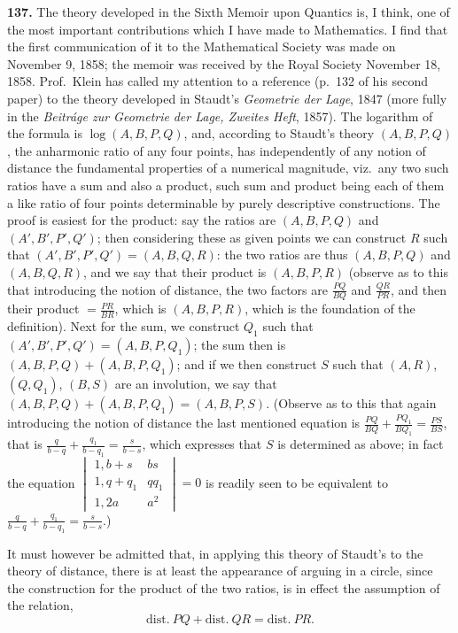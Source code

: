 \documentclass[11pt,a4paper]{book}
\begin{document}
\begin{center}
\textbf{137.} The theory developed in the Sixth Memoir upon Quantics is, I think,
one of the most important contributions which I have made to Mathematics. I find
that the first communication of it to the Mathematical Society was made on November
9, 1858; the memoir was received by the Royal Society November 18, 1858. Prof.\ Klein
has called my attention to a reference (p.~132 of his second paper) to the theory
developed in Staudt's \textit{Geometrie der Lage}, 1847 (more fully in the \textit{Beitr\'{a}ge zur Geometrie}
\textit{der Lage, Zweites Heft}, 1857). The logarithm of the formula is $\log(A,B,P,Q)$, and,
according to Staudt's theory $(A,B,P,Q)$, the anharmonic ratio of any four points, has
independently of any notion of distance the fundamental properties of a numerical
magnitude, viz.\ any two such ratios have a sum and also a product, such sum and
product being each of them a like ratio of four points determinable by purely descriptive
constructions. The proof is easiest for the product: say the ratios are $(A,B,P,Q)$ and
$(A',B',P',Q')$; then considering these as given points we can construct $R$ such that
$(A',B',P',Q') = (A,B,Q,R)$: the two ratios are thus $(A,B,P,Q)$ and $(A,B,Q,R)$, and we
say that their product is $(A,B,P,R)$ (observe as to this that introducing the notion of
distance, the two factors are $\frac{PQ}{BQ}$ and $\frac{QR}{PR}$, and then their product $=\frac{PR}{BR}$, which is $(A,B,P,R)$,
which is the foundation of the definition). Next for the sum, we construct $Q_1$ such that
$(A',B',P',Q') = (A,B,P,Q_1)$; the sum then is $(A,B,P,Q)+(A,B,P,Q_1)$; and if we then
construct $S$ such that $(A,R)$, $(Q,Q_1)$, $(B,S)$ are an involution, we say that
$(A,B,P,Q)+(A,B,P,Q_1) = (A,B,P,S)$. (Observe as to this that again introducing the
notion of distance the last mentioned equation is $\frac{PQ}{BQ}+\frac{PQ_1}{BQ_1}=\frac{PS}{BS}$, that is
$\frac{q}{b-q}+\frac{q_1}{b-q_1}=\frac{s}{b-s}$, which expresses that $S$ is determined as above; in fact the equation
$\begin{vmatrix}1,b+s&bs\\1,q+q_1&qq_1\\1,2a&a^2\end{vmatrix}=0$ is readily seen to be equivalent to
$\frac{q}{b-q}+\frac{q_1}{b-q_1}=\frac{s}{b-s}$.)

It must however be admitted that, in applying this theory of Staudt's to the theory
of distance, there is at least the appearance of arguing in a circle, since the construction
for the product of the two ratios, is in effect the assumption of the relation,
\[
\text{dist.}\ PQ + \text{dist.}\ QR = \text{dist.}\ PR.
\]


\end{center}
\end{document}
